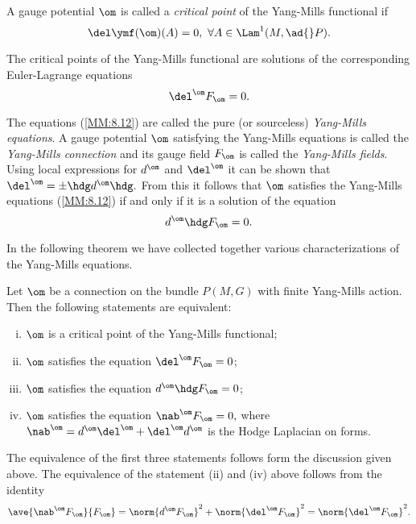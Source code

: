 A gauge potential $\om$ is called a \emph{critical point} of the Yang-Mills functional if
\begin{equation}
 \label{MM:8.11}
 \del \ymf(\om)(A)=0, \ \forall A \in \Lam^{1}(M, \ad{} P).
\end{equation}

The critical points of the Yang-Mills functional are solutions of the corresponding Euler-Lagrange equations
\begin{equation}
 \label{MM:8.12}
 \del^{\om}F_{\om}=0.
\end{equation}

The equations (\ref{MM:8.12}) are called the pure (or sourceless) \emph{Yang-Mills equations}. A gauge potential $\om$
satisfying the Yang-Mills equations is called the \emph{Yang-Mills connection} and its gauge field $F_{\om}$ is called
the \emph{Yang-Mills fields}. Using local expressions for $d^{\om}$ and $\del^{\om}$ it can be shown that
$\del^{\om}=\pm \hdg d^{\om} \hdg.$ From this it follows that $\om$ satisfies the Yang-Mills equations (\ref{MM:8.12})
if and only if it is a solution of the equation
\begin{equation}
 \label{MM:8.13}
 d^{\om} \hdg F_{\om} =0.
\end{equation}

In the following theorem we have collected together various characterizations of the Yang-Mills equations.

\begin{thm}
 \label{MM:thm:8.2}
 Let $\om$ be a connection on the bundle $P(M,G)$ with finite Yang-Mills action. Then the following statements are
equivalent:
\begin{enumerate}[(i)]
 \item $\om$ is a critical point of the Yang-Mills functional;
 \item $\om$ satisfies the equation $\del^{\om}F_{\om}=0$;
 \item $\om$ satisfies the equation $d^{\om}\hdg F_{\om}=0$;
 \item $\om$ satisfies the equation $\nab^{\om}F_{\om}=0,$ where $\nab^{\om}=d^{\om}\del^{\om}+\del^{\om}d^{\om}$ is
the Hodge Laplacian on forms.
\end{enumerate}
\end{thm}

The equivalence of the first three statements follows form the discussion given above. The equivalence of the statement
(ii) and (iv) above follows from the identity
$$
\ave{\nab^{\om}F_{\om}}{F_{\om}}=\norm{d^{\om}F_{\om}}^{2}+\norm{\del^{\om}F_{\om}}^{2}=\norm{\del^{\om}F_{\om}}^{2}.
$$

